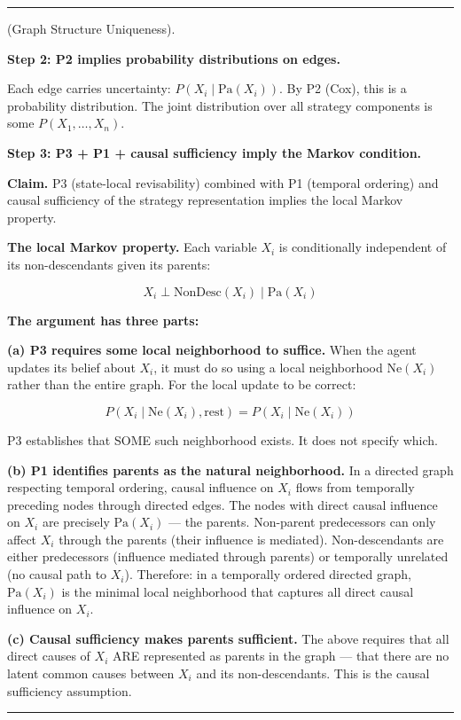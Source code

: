 \documentclass[11pt,oneside]{article}
\newcounter{claim}[section]
\renewcommand{\theclaim}{\thesection.\arabic{claim}}
\newenvironment{segment}[2]{%
  \refstepcounter{claim}%
  \bigskip\noindent\hrule\smallskip
  \noindent{\bfseries #1~\theclaim}\enskip(#2).\par\smallskip
  \noindent\ignorespaces
}{%
  \par\smallskip\noindent\hrule\bigskip
}
\newenvironment{derivation}[1][]{\begin{segment}{Derivation}{#1}}{\end{segment}}
\begin{document}
\begin{derivation}[Graph Structure Uniqueness]
\medskip\noindent\textbf{Step 2: P2 implies probability distributions on edges.}


Each edge carries uncertainty: $P(X_i \mid \text{Pa}(X_i))$. By P2 (Cox), this is a probability distribution. The joint distribution over all strategy components is some $P(X_1, \ldots, X_n)$.


\medskip\noindent\textbf{Step 3: P3 + P1 + causal sufficiency imply the Markov condition.}



\textbf{Claim.} P3 (state-local revisability) combined with P1 (temporal ordering) and causal sufficiency of the strategy representation implies the local Markov property.

\textbf{The local Markov property.} Each variable $X_i$ is conditionally independent of its non-descendants given its parents:

$$X_i \perp \text{NonDesc}(X_i) \mid \text{Pa}(X_i)$$

\textbf{The argument has three parts:}

\textbf{(a) P3 requires some local neighborhood to suffice.} When the agent updates its belief about $X_i$, it must do so using a local neighborhood $\text{Ne}(X_i)$ rather than the entire graph. For the local update to be correct:

$$P(X_i \mid \text{Ne}(X_i), \text{rest}) = P(X_i \mid \text{Ne}(X_i))$$

P3 establishes that SOME such neighborhood exists. It does not specify which.

\textbf{(b) P1 identifies parents as the natural neighborhood.} In a directed graph respecting temporal ordering, causal influence on $X_i$ flows from temporally preceding nodes through directed edges. The nodes with direct causal influence on $X_i$ are precisely $\text{Pa}(X_i)$ — the parents. Non-parent predecessors can only affect $X_i$ through the parents (their influence is mediated). Non-descendants are either predecessors (influence mediated through parents) or temporally unrelated (no causal path to $X_i$). Therefore: in a temporally ordered directed graph, $\text{Pa}(X_i)$ is the minimal local neighborhood that captures all direct causal influence on $X_i$.

\textbf{(c) Causal sufficiency makes parents sufficient.} The above requires that all direct causes of $X_i$ ARE represented as parents in the graph — that there are no latent common causes between $X_i$ and its non-descendants. This is the causal sufficiency assumption.


\end{derivation}
\end{document}
